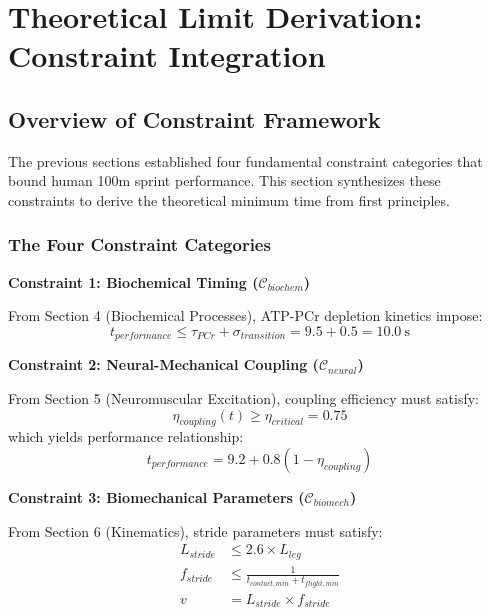 \documentclass[10pt]{article}
\begin{document}
\section{Theoretical Limit Derivation: Constraint Integration}

\subsection{Overview of Constraint Framework}

The previous sections established four fundamental constraint categories that bound human 100m sprint performance. This section synthesizes these constraints to derive the theoretical minimum time from first principles.

\subsubsection{The Four Constraint Categories}

\textbf{Constraint 1: Biochemical Timing ($\mathcal{C}_{biochem}$)}

From Section 4 (Biochemical Processes), ATP-PCr depletion kinetics impose:
\begin{equation}
t_{performance} \leq \tau_{PCr} + \sigma_{transition} = 9.5 + 0.5 = 10.0~\text{s}
\label{eq:C1_biochem}
\end{equation}

\textbf{Constraint 2: Neural-Mechanical Coupling ($\mathcal{C}_{neural}$)}

From Section 5 (Neuromuscular Excitation), coupling efficiency must satisfy:
\begin{equation}
\eta_{coupling}(t) \geq \eta_{critical} = 0.75
\label{eq:C2_neural}
\end{equation}
which yields performance relationship:
\begin{equation}
t_{performance} = 9.2 + 0.8(1 - \eta_{coupling})
\label{eq:C2_performance}
\end{equation}

\textbf{Constraint 3: Biomechanical Parameters ($\mathcal{C}_{biomech}$)}

From Section 6 (Kinematics), stride parameters must satisfy:
\begin{align}
L_{stride} &\leq 2.6 \times L_{leg} \label{eq:C3a_length}\\
f_{stride} &\leq \frac{1}{t_{contact,min} + t_{flight,min}} \label{eq:C3b_frequency}\\
v &= L_{stride} \times f_{stride} \label{eq:C3c_velocity}
\end{align}
\end{document}
